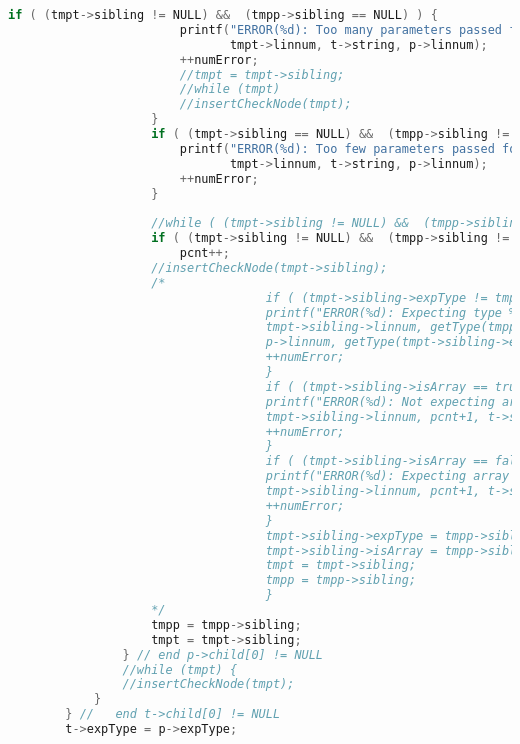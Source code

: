 \documentclass[12pt]{book}
\begin{document}
\begin{lstlisting}[language=c++]
                    if ( (tmpt->sibling != NULL) &&  (tmpp->sibling == NULL) ) {
                        printf("ERROR(%d): Too many parameters passed for function '%s' defined on line %d.\n", 
                               tmpt->linnum, t->string, p->linnum);
                        ++numError;
                        //tmpt = tmpt->sibling;
                        //while (tmpt)
                        //insertCheckNode(tmpt);
                    }
                    if ( (tmpt->sibling == NULL) &&  (tmpp->sibling != NULL) ) {
                        printf("ERROR(%d): Too few parameters passed for function '%s' defined on line %d.\n", 
                               tmpt->linnum, t->string, p->linnum);
                        ++numError;
                    }
                
                    //while ( (tmpt->sibling != NULL) &&  (tmpp->sibling != NULL) ) {
                    if ( (tmpt->sibling != NULL) &&  (tmpp->sibling != NULL) ) 
                        pcnt++;
                    //insertCheckNode(tmpt->sibling);
                    /*                          
                                    if ( (tmpt->sibling->expType != tmpp->sibling->expType) && (tmpt->sibling->expType != Undefined) ) {
                                    printf("ERROR(%d): Expecting type %s in parameter %i of call to '%s' defined on line %d but got type %s.\n", 
                                    tmpt->sibling->linnum, getType(tmpp->sibling->expType), pcnt+1, t->string, 
                                    p->linnum, getType(tmpt->sibling->expType));
                                    ++numError;
                                    }
                                    if ( (tmpt->sibling->isArray == true) && (tmpp->sibling->isArray == false) ) {
                                    printf("ERROR(%d): Not expecting array in parameter %i of call to '%s' defined on line %d.\n", 
                                    tmpt->sibling->linnum, pcnt+1, t->string, p->linnum);
                                    ++numError;
                                    }
                                    if ( (tmpt->sibling->isArray == false) && (tmpp->sibling->isArray == true) ) {
                                    printf("ERROR(%d): Expecting array in parameter %i of call to '%s' defined on line %d.\n", 
                                    tmpt->sibling->linnum, pcnt+1, t->string, p->linnum);
                                    ++numError;
                                    } 
                                    tmpt->sibling->expType = tmpp->sibling->expType;
                                    tmpt->sibling->isArray = tmpp->sibling->isArray; 
                                    tmpt = tmpt->sibling;
                                    tmpp = tmpp->sibling;
                                    }
                    */
                    tmpp = tmpp->sibling;
                    tmpt = tmpt->sibling;
                } // end p->child[0] != NULL
                //while (tmpt) {
                //insertCheckNode(tmpt);
            } 
        } //   end t->child[0] != NULL
        t->expType = p->expType;


\end{lstlisting}
\end{document}
